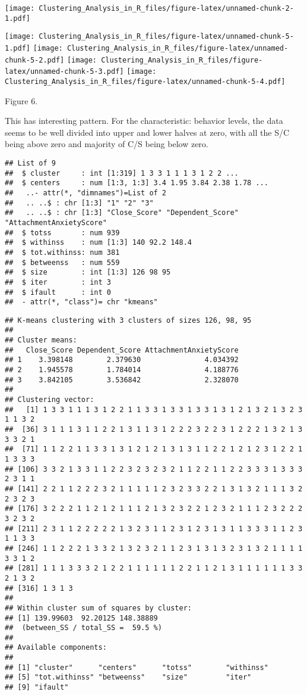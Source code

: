 \documentclass[]{article}
\begin{document}
\texttt{[image: Clustering\_Analysis\_in\_R\_files/figure-latex/unnamed-chunk-2-1.pdf]}

\texttt{[image: Clustering\_Analysis\_in\_R\_files/figure-latex/unnamed-chunk-5-1.pdf]}
\texttt{[image: Clustering\_Analysis\_in\_R\_files/figure-latex/unnamed-chunk-5-2.pdf]}
\texttt{[image: Clustering\_Analysis\_in\_R\_files/figure-latex/unnamed-chunk-5-3.pdf]}
\texttt{[image: Clustering\_Analysis\_in\_R\_files/figure-latex/unnamed-chunk-5-4.pdf]}

\begin{center}
Figure 6.
\end{center}

This has interesting pattern. For the characteristic: behavior levels,
the data seems to be well divided into upper and lower halves at zero,
with all the S/C being above zero and majority of C/S being below zero.

\begin{verbatim}
## List of 9
##  $ cluster     : int [1:319] 1 3 3 1 1 1 3 1 2 2 ...
##  $ centers     : num [1:3, 1:3] 3.4 1.95 3.84 2.38 1.78 ...
##   ..- attr(*, "dimnames")=List of 2
##   .. ..$ : chr [1:3] "1" "2" "3"
##   .. ..$ : chr [1:3] "Close_Score" "Dependent_Score" "AttachmentAnxietyScore"
##  $ totss       : num 939
##  $ withinss    : num [1:3] 140 92.2 148.4
##  $ tot.withinss: num 381
##  $ betweenss   : num 559
##  $ size        : int [1:3] 126 98 95
##  $ iter        : int 3
##  $ ifault      : int 0
##  - attr(*, "class")= chr "kmeans"
\end{verbatim}

\begin{verbatim}
## K-means clustering with 3 clusters of sizes 126, 98, 95
## 
## Cluster means:
##   Close_Score Dependent_Score AttachmentAnxietyScore
## 1    3.398148        2.379630               4.034392
## 2    1.945578        1.784014               4.188776
## 3    3.842105        3.536842               2.328070
## 
## Clustering vector:
##   [1] 1 3 3 1 1 1 3 1 2 2 1 1 3 3 1 3 3 1 3 3 1 3 1 2 1 3 2 1 3 2 3 1 1 3 2
##  [36] 3 1 1 1 3 1 1 2 2 1 3 1 1 3 1 2 2 2 3 2 2 3 1 2 2 2 1 3 2 1 3 3 3 2 1
##  [71] 1 1 2 2 1 1 3 3 1 3 1 2 1 2 1 3 1 3 1 1 2 2 1 2 1 2 3 1 2 2 1 1 3 3 3
## [106] 3 3 2 1 3 3 1 1 2 2 3 2 3 2 3 2 1 1 2 2 1 1 2 2 3 3 3 1 3 3 3 2 3 1 1
## [141] 2 2 1 1 2 2 2 3 2 1 1 1 1 1 2 3 2 3 3 2 2 1 3 1 3 2 1 1 1 3 2 2 3 2 3
## [176] 3 2 2 2 1 1 2 1 2 1 1 1 2 1 3 2 3 2 2 1 2 3 2 1 1 1 2 3 2 2 2 3 2 3 2
## [211] 2 3 1 1 2 2 2 2 2 1 3 2 3 1 1 2 3 1 2 3 1 3 1 1 3 3 3 1 1 2 3 1 1 3 3
## [246] 1 1 2 2 2 1 3 3 2 1 3 2 3 2 1 1 2 3 1 3 1 3 2 3 1 3 2 1 1 1 1 3 3 1 2
## [281] 1 1 1 3 3 3 2 1 2 2 1 1 1 1 1 1 2 2 1 1 2 1 3 1 1 1 1 1 1 3 3 2 1 3 2
## [316] 1 3 1 3
## 
## Within cluster sum of squares by cluster:
## [1] 139.99603  92.20125 148.38889
##  (between_SS / total_SS =  59.5 %)
## 
## Available components:
## 
## [1] "cluster"      "centers"      "totss"        "withinss"    
## [5] "tot.withinss" "betweenss"    "size"         "iter"        
## [9] "ifault"
\end{verbatim}
\end{document}
